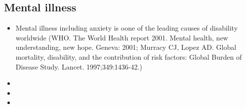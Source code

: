 \documentclass{article}
\begin{document}
\subsection{Mental illness}
\begin{itemize}
	\item Mental illness including anxiety is oone of the leading causes of disability worldwide (WHO. The World Health report 2001. Mental health, new understanding, new hope. Geneva: 2001; Murracy CJ, Lopez AD. Global mortality, disability, and the contribution of risk factors: Global Burden of Disease Study. Lancet. 1997;349:1436-42.)
	\item 
	\item 
	\item 
\end{itemize}
\end{document}
